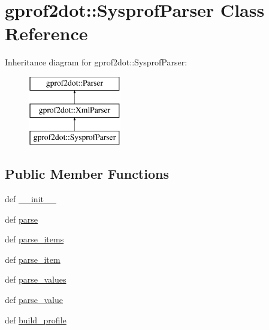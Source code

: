 \hypertarget{classgprof2dot_1_1SysprofParser}{
\section{gprof2dot::SysprofParser Class Reference}
\label{classgprof2dot_1_1SysprofParser}
}
Inheritance diagram for gprof2dot::SysprofParser:\begin{figure}[H]
\begin{center}
\leavevmode
\includegraphics[height=3.000000cm]{classgprof2dot_1_1SysprofParser}
\end{center}
\end{figure}
\subsection*{Public Member Functions}
\begin{DoxyCompactItemize}
\item 
def \hyperlink{classgprof2dot_1_1SysprofParser_a17c27d48ae775d1e642aadaf28e07da9}{\_\-\_\-init\_\-\_\-}
\item 
def \hyperlink{classgprof2dot_1_1SysprofParser_acee5f7e208dd8f8d6ed73b88a70f2e7b}{parse}
\item 
def \hyperlink{classgprof2dot_1_1SysprofParser_a4829ef3c25ef3586b4fcc3bf89fc80ba}{parse\_\-items}
\item 
def \hyperlink{classgprof2dot_1_1SysprofParser_ad2c20a296b68975b702260c9dcc4d54a}{parse\_\-item}
\item 
def \hyperlink{classgprof2dot_1_1SysprofParser_abe14bb4484c34c33dfc1b3dd8c925b59}{parse\_\-values}
\item 
def \hyperlink{classgprof2dot_1_1SysprofParser_ae3375394224178726619d8f36a5f03b6}{parse\_\-value}
\item 
def \hyperlink{classgprof2dot_1_1SysprofParser_a21c26196a0c29b4478a22dd10b77c94b}{build\_\-profile}
\end{DoxyCompactItemize}



